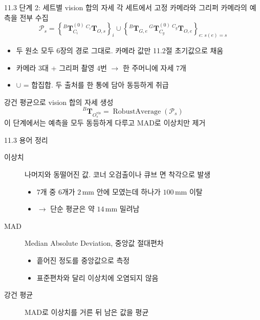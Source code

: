 \documentclass[aspectratio=169,11pt]{beamer}
\newcommand{\T}[3][]{{}^{#2}\mathbf{T}^{#1}_{#3}}   %
\newcommand{\Ovis}{O^{\mathrm{vis}}}   %
\begin{document}
\begin{frame}{11.3 단계 2: 세트별 vision 합의 자세}
  각 세트에서 고정 카메라와 그리퍼 카메라의 예측을 전부 수집
  {\small
  \[
    \mathcal{P}_s
    =
    \left\{\T[(0)]{B}{C_i}\,\T{C_i}{O,s}\right\}_{i}
    \cup
    \left\{\T{B}{G,e}\,\T[(0)]{G}{C_g}\,\T{C_g}{O,e}\right\}_{e:\,s(e)=s}
  \]
  }
  \begin{itemize}
    \item 두 원소 모두 6장의 경로 그대로. 카메라 값만 11.2절 초기값으로 채움
    \item 카메라 $3$대 + 그리퍼 촬영 $4$번 $\rightarrow$ 한 주머니에 자세 $7$개
    \item $\cup$ = 합집합. 두 출처를 한 통에 담아 동등하게 취급
  \end{itemize}
  \vfill
  강건 평균으로 vision 합의 자세 생성
  \[
    \T{B}{\Ovis_s} = \operatorname{RobustAverage}\left(\mathcal{P}_s\right)
  \]
  이 단계에서는 예측을 모두 동등하게 다루고 MAD로 이상치만 제거
\end{frame}

\begin{frame}{11.3 용어 정리}
  \begin{description}
    \item[이상치] 나머지와 동떨어진 값. 코너 오검출이나 큐브 면 착각으로 발생
      \begin{itemize}
        \item $7$개 중 $6$개가 $2\,\mathrm{mm}$ 안에 모였는데 하나가 $100\,\mathrm{mm}$ 이탈
        \item $\rightarrow$ 단순 평균은 약 $14\,\mathrm{mm}$ 밀려남
      \end{itemize}
    \item[MAD] Median Absolute Deviation, 중앙값 절대편차
      \begin{itemize}
        \item 흩어진 정도를 중앙값으로 측정
        \item 표준편차와 달리 이상치에 오염되지 않음
      \end{itemize}
    \item[강건 평균] MAD로 이상치를 거른 뒤 남은 값을 평균
  \end{description}
\end{frame}
\end{document}
